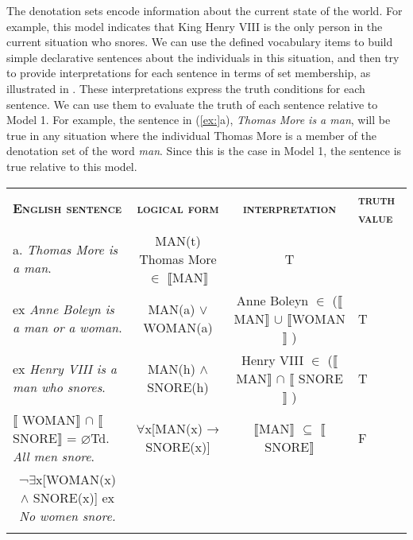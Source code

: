 The denotation sets encode information about the current state of the world. For example, this model indicates that King Henry VIII is the only person in the current situation who snores. We can use the defined vocabulary items to build simple declarative sentences about the individuals in this situation, and then try to provide interpretations for each sentence in terms of set membership, as illustrated in . These interpretations express the truth conditions for each sentence. We can use them to evaluate the truth of each sentence relative to Model 1. For example, the sentence in (\ref{ex:}a), \textit{Thomas More is a man}, will be true in any situation where the individual Thomas More is a member of the denotation set of the word \textit{man}. Since this is the case in Model 1, the sentence is true relative to this model.




\begin{tabularx}{\textwidth}{XXXXXX}
\lsptoprule

\bfseries\scshape English sentence & \multicolumn{2}{c}{\bfseries\scshape logical form} & \multicolumn{2}{c}{\bfseries\scshape interpretation} & \bfseries\scshape truth value\\

a. \textit{Thomas More is a man}. & \multicolumn{2}{c}{MAN(t)
\newline
Thomas More ${\in}$ \textsc{$\llbracket$}MAN$\rrbracket$ } & \multicolumn{2}{c}{ T} & \\

ex \textit{Anne Boleyn is} \textit{a man or} \textit{a woman}. & \multicolumn{2}{c}{MAN(a) $\vee$ WOMAN(a)} & \multicolumn{2}{c}{Anne Boleyn ${\in}$
\newline
(\textsc{$\llbracket$}MAN$\rrbracket$  ${\cup}$ \textsc{$\llbracket$}WOMAN$\rrbracket$ )} & T\\

ex \textit{Henry VIII is a man who snores}. & \multicolumn{2}{c}{MAN(h) $\wedge$ \textsc{SNORE}(h)} & \multicolumn{2}{c}{Henry VIII ${\in}$ (\textsc{$\llbracket$}MAN$\rrbracket$  ${\cap}$ \textsc{$\llbracket$ SNORE}$\rrbracket$ )} & T\\

 \textsc{$\llbracket$ WO}MAN$\rrbracket$  ${\cap}$ \textsc{$\llbracket$ SNORE}$\rrbracket$  = ⌀Td. \textit{All men snore}.& \multicolumn{2}{c}{${\forall}$x[MAN(x) → \textsc{SNORE}(x)]} & \multicolumn{2}{c}{\textsc{$\llbracket$}MAN$\rrbracket$  ${\subseteq}$ \textsc{$\llbracket$ SNORE}$\rrbracket$ } & F\\
 
\multicolumn{1}{c}{¬${\exists}$x[WOMAN(x) $\wedge$ \textsc{SNORE}(x)]
\newline
ex \textit{No women snore.}} &  & \multicolumn{2}{c}{} & \multicolumn{2}{c}{}\\
\lspbottomrule
\end{tabularx}

